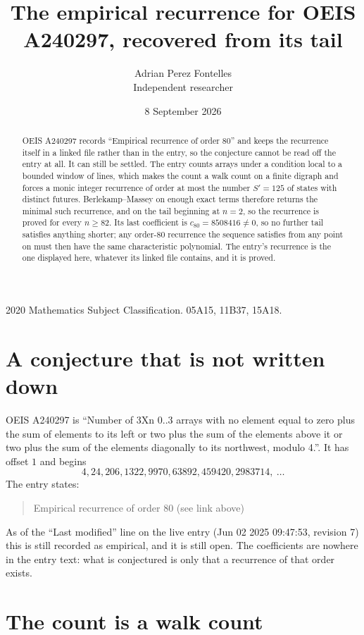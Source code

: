 \documentclass[11pt,a4paper]{article}
\title{The empirical recurrence for OEIS A240297, recovered from its tail}
\author{Adrian Perez Fontelles\\ \small Independent researcher}
\date{8 September 2026}
\theoremstyle{plain}
\theoremstyle{definition}
\begin{document}
\maketitle

\begin{abstract}
OEIS A240297 records ``Empirical recurrence of order $80$'' and keeps the recurrence itself in
a linked file rather than in the entry, so the conjecture cannot be read off the entry at all.
It can still be settled. The entry counts arrays under a condition local to a bounded window of
lines, which makes the count a walk count on a finite digraph and forces a monic integer
recurrence of order at most the number $S'=125$ of states with distinct futures. Berlekamp--Massey on
enough exact terms therefore returns the minimal such recurrence, and on the tail beginning at $n=2$, so the recurrence is proved for every $n\ge82$.
Its last coefficient is $c_{80}=8508416\neq0$, so no further tail satisfies anything
shorter; any order-$80$ recurrence the sequence satisfies from any point on must then have
the same characteristic polynomial. The entry's recurrence is the one displayed here, whatever
its linked file contains, and it is proved.
\end{abstract}

\noindent\small 2020 Mathematics Subject Classification. 05A15, 11B37, 15A18.\normalsize

\section{A conjecture that is not written down}

OEIS A240297 is ``Number of 3Xn 0..3 arrays with no element equal to zero plus the sum of elements to its left or two plus the sum of the elements above it or two plus the sum of the elements diagonally to its northwest, modulo 4.''. It has offset $1$ and begins
\[
4, 24, 206, 1322, 9970, 63892, 459420, 2983714,\ \dots
\]
The entry states:
\begin{quote}
Empirical recurrence of order 80 (see link above)
\end{quote}
As of the ``Last modified'' line on the live entry (Jun 02 2025 09:47:53, revision 7)
this is still recorded as empirical, and it is still open. The coefficients are nowhere in the
entry text: what is conjectured is only that a recurrence of that order exists.

\section{The count is a walk count}
\end{document}
